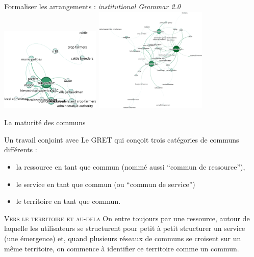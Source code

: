 \documentclass[newPxFont]{beamer}
\begin{document}
\begin{frame}[c]{Formaliser les arrangements : \textit{institutional Grammar 2.0}}
    \vspace{-1cm}
    \includegraphics[height=4cm]{img/sg_agent_Admin.png}
    \includegraphics[height=5cm]{img/sg_popLozc.png}
\end{frame}
  
\begin{frame}[c]{La maturité des communs}
      \vspace{-1cm}
      
    Un travail conjoint avec Le GRET qui conçoit trois catégories de communs différents :
      \begin{itemize}
          \item la ressource en tant que commun (nommé aussi “commun de ressource”),
          \item le service en tant que commun (ou “commun de service”)
          \item le territoire en tant que commun.
      \end{itemize}
      
       \small{
         \begin{alertblock}{\textsc{Vers le territoire et au-dela}}
           On entre toujours par une ressource, autour de laquelle les utilisateurs se structurent pour petit à petit structurer un service (une émergence) et, quand plusieurs réseaux de communs se croisent sur un même territoire, on commence à identifier ce territoire comme un commun.
         \end{alertblock}
       }
\end{frame}
\end{document}
